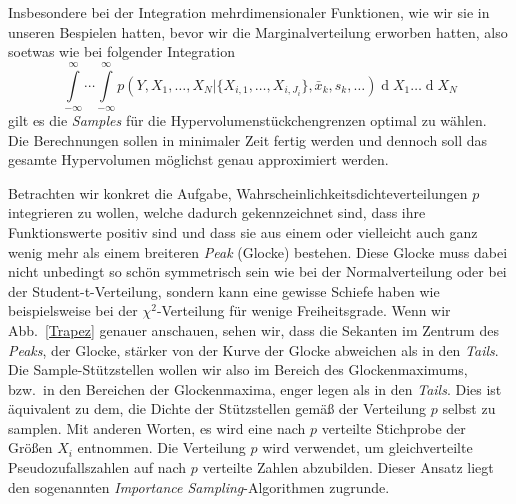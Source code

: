 
Insbesondere bei der Integration mehrdimensionaler Funktionen, wie wir sie
in unseren Bespielen hatten, bevor wir die Marginalverteilung erworben hatten,
also soetwas wie bei folgender Integration
$$
\int\limits_{-\infty}^\infty \cdots \int\limits_{-\infty}^\infty
p(Y, X_1, \dots, X_N | \{X_{i,1}, \dots, X_{i,J_i}\}, \bar x_k, s_k, \dots)
\operatorname{d}X_1 \dots \operatorname{d}X_N
$$
gilt es die \textsl{Samples} für die Hypervolumenstückchengrenzen optimal zu wählen.
Die Berechnungen sollen in minimaler Zeit fertig werden und dennoch soll das
gesamte Hypervolumen möglichst genau approximiert werden.

Betrachten wir konkret die Aufgabe, Wahrscheinlichkeitsdichteverteilungen $p$
integrieren zu wollen, welche dadurch gekennzeichnet sind, dass ihre Funktionswerte
positiv sind und dass sie aus einem
oder vielleicht auch ganz wenig mehr als einem breiteren \textsl{Peak} (Glocke) bestehen.
Diese Glocke muss dabei nicht unbedingt so schön symmetrisch sein wie bei der
Normalverteilung oder bei der Student-t-Verteilung, sondern kann eine gewisse Schiefe haben
wie beispielsweise bei der $\chi^2$-Verteilung für wenige Freiheitsgrade.
Wenn wir Abb.~\ref{Trapez} genauer anschauen, sehen wir, dass die Sekanten im Zentrum
des \textsl{Peaks}, der Glocke, stärker von der Kurve der Glocke abweichen als in den
\textsl{Tails}. Die Sample-Stützstellen wollen wir also im Bereich des Glockenmaximums, bzw.\
in den Bereichen der Glockenmaxima, enger legen als in den \textsl{Tails}. Dies ist äquivalent
zu dem, die Dichte der Stützstellen gemäß der Verteilung $p$ selbst zu samplen.
Mit anderen Worten, es wird eine nach $p$ verteilte Stichprobe der Größen $X_i$
entnommen. Die Verteilung $p$ wird verwendet, um gleichverteilte Pseudozufallszahlen auf nach $p$
verteilte Zahlen abzubilden.
Dieser Ansatz liegt den sogenannten \textsl{Importance Sampling}-Algorithmen zugrunde.

